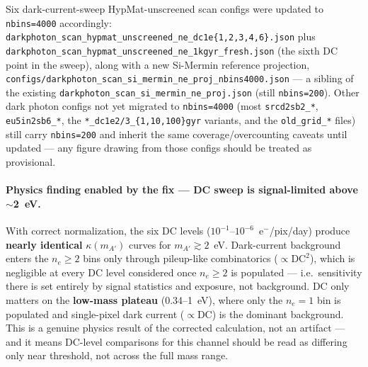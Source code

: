 Six dark-current-sweep HypMat-unscreened scan configs were updated to
\texttt{nbins=4000} accordingly:
\texttt{darkphoton\_scan\_hypmat\_unscreened\_ne\_dc1e\{1,2,3,4,6\}.json}
plus \texttt{darkphoton\_scan\_hypmat\_unscreened\_ne\_1kgyr\_fresh.json}
(the sixth DC point in the sweep), along with a new Si-Mermin reference
projection, \texttt{configs/darkphoton\_scan\_si\_mermin\_ne\_proj\_nbins4000.json}
— a sibling of the existing \texttt{darkphoton\_scan\_si\_mermin\_ne\_proj.json}
(still \texttt{nbins=200}). Other dark photon configs not yet migrated to
\texttt{nbins=4000} (most \texttt{srcd2sb2\_*}, \texttt{eu5in2sb6\_*}, the
\texttt{*\_dc1e2/3\_\{1,10,100\}gyr} variants, and the \texttt{old\_grid\_*}
files) still carry \texttt{nbins=200} and inherit the same
coverage/overcounting caveats until updated — any figure drawing from those
configs should be treated as provisional.

\paragraph{Physics finding enabled by the fix — DC sweep is signal-limited
above $\sim$2~eV.} With correct normalization, the six DC levels
($10^{-1}$--$10^{-6}$~e$^-$/pix/day) produce \textbf{nearly identical}
$\kappa(m_{A'})$ curves for $m_{A'} \gtrsim 2$~eV. Dark-current background
enters the $n_e\geq2$ bins only through pileup-like combinatorics
($\propto\mathrm{DC}^2$), which is negligible at every DC level considered
once $n_e\geq2$ is populated — i.e.\ sensitivity there is set entirely by
signal statistics and exposure, not background. DC only matters on the
\textbf{low-mass plateau} (0.34--1~eV), where only the $n_e=1$ bin is
populated and single-pixel dark current ($\propto\mathrm{DC}$) is the
dominant background. This is a genuine physics result of the corrected
calculation, not an artifact — and it means DC-level comparisons for this
channel should be read as differing only near threshold, not across the
full mass range.
